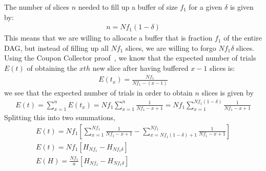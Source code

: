 \documentclass[runningheads]{llncs}
\begin{document}
The number of slices $n$ needed to fill up a buffer of size $f_1$ for a given $\delta$ is given by:
\begin{gather}
	n = Nf_1(1-\delta) %
\end{gather}
This means that we are willing to allocate a buffer that is fraction $f_1$ of the entire DAG, but instead of filling up all $Nf_1$ slices, we are willing to forgo $Nf_1\delta$ slices. Using the Coupon Collector proof~\cite{couponCollector}, we know that the expected number of trials $E(t)$ of obtaining the $xth$ new slice after having buffered $x-1$ slices is:\\
\begin{gather}
	E(t_x) = \frac{Nf_1}{Nf_1-(x-1)}
\end{gather}
we see that the expected number of trials in order to obtain $n$ slices is given by
\begin{gather}
	E(t) = \sum_{x=1}^{n}E(t_x) = Nf_1\sum_{x=1}^{n}\frac{1}{Nf_1-x+1} = Nf_1\sum_{x=1}^{Nf_1(1-\delta)}\frac{1}{Nf_1-x+1}
\end{gather}
Splitting this into two summations,
\begin{gather}
	E(t) = Nf_1[\sum_{x=1}^{Nf_1}\frac{1}{Nf_1-x+1} - \sum_{x=Nf_1(1-\delta)+1}^{Nf_1}\frac{1}{Nf_1-x+1}] \\
    E(t) = Nf_1[H_{Nf_1} -H_{Nf_1\delta}] \\
    \label{eq:expectedHashes}
	E(H) = \frac{Nf_1}{a}[H_{Nf_1} -H_{Nf_1\delta}]
\end{gather}
\end{document}
